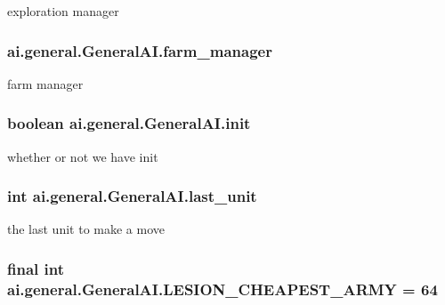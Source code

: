 \label{classai_1_1general_1_1_general_a_i_acd7fe2fea4dd83aa8d17f6ba6120700a}
exploration manager \hypertarget{classai_1_1general_1_1_general_a_i_aac6a7b3f65ae27624edf09c9df39c8f7}{
\subsubsection[{farm\_\-manager}]{ {\bf ai.general.GeneralAI.farm\_\-manager}}}
\label{classai_1_1general_1_1_general_a_i_aac6a7b3f65ae27624edf09c9df39c8f7}
farm manager \hypertarget{classai_1_1general_1_1_general_a_i_a66079be9509d195d238e176d121a90b5}{
\subsubsection[{init}]{\setlength{\rightskip}{0pt plus 5cm}boolean {\bf ai.general.GeneralAI.init}}}
\label{classai_1_1general_1_1_general_a_i_a66079be9509d195d238e176d121a90b5}
whether or not we have init \hypertarget{classai_1_1general_1_1_general_a_i_a999b2485d3ac59837ac62c40550bfbeb}{
\subsubsection[{last\_\-unit}]{\setlength{\rightskip}{0pt plus 5cm}int {\bf ai.general.GeneralAI.last\_\-unit}}}
\label{classai_1_1general_1_1_general_a_i_a999b2485d3ac59837ac62c40550bfbeb}
the last unit to make a move \hypertarget{classai_1_1general_1_1_general_a_i_a22cac1ee83cc2c16a8a80c12b1950064}{
\subsubsection[{LESION\_\-CHEAPEST\_\-ARMY}]{\setlength{\rightskip}{0pt plus 5cm}final int {\bf ai.general.GeneralAI.LESION\_\-CHEAPEST\_\-ARMY} = 64}}
